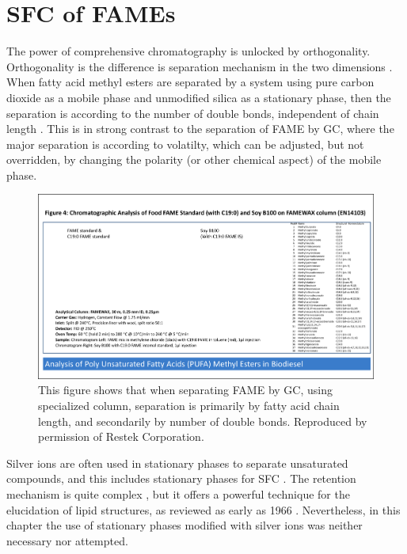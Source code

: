 \section{SFC of FAMEs}

The power of comprehensive chromatography is unlocked by orthogonality.
Orthogonality is the difference is separation mechanism in the two dimensions
. When fatty acid methyl esters are separated
by a system using pure carbon dioxide as a mobile phase and unmodified silica as
a stationary phase, then the separation is according to the number of double
bonds, independent of chain length \autocite{Robertson1991, Smith1994,
Smith2001}. This is in strong contrast to the separation of FAME by GC, where
the major separation is according to volatilty, which can be adjusted, but not
overridden, by changing the polarity (or other chemical aspect) of the mobile
phase.

\begin{figure}
\centering
\includegraphics[width=\textwidth]{Figures/FAME-GC.pdf}
\decoRule

\caption[Separation of FAME by GC]{This figure shows that when separating FAME
by GC, using specialized column, separation is primarily by fatty acid chain
length, and secondarily by number of double bonds. Reproduced by permission of Restek Corporation.}

\label{fig:co2fill}
\end{figure}

Silver ions are often used in stationary phases to separate unsaturated
compounds, and this includes stationary phases for SFC \autocite{Sandra2002,
Potgieter2013}. The retention mechanism is quite complex
\autocite{Nikolova-Damyanova2019}, but it offers a powerful technique for the
elucidation of lipid structures, as reviewed as early as 1966
\autocite{Morris1966}. Nevertheless, in this chapter the use of stationary
phases modified with silver ions was neither necessary nor attempted.


